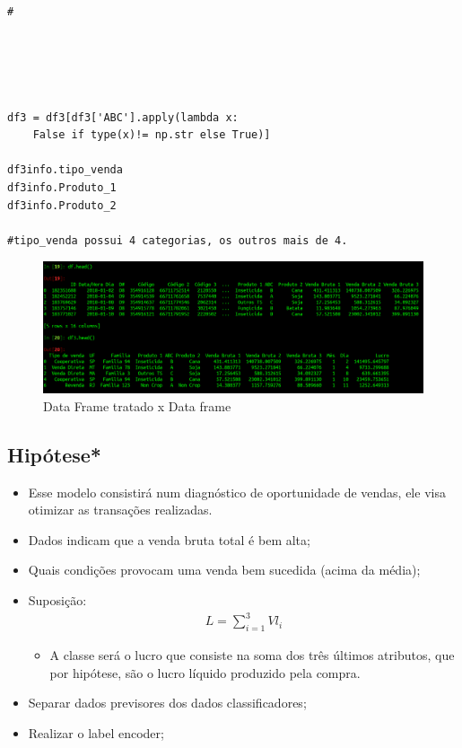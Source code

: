 \documentclass[compress]{beamer}
\begin{document}
\begin{verbatim}
#





df3 = df3[df3['ABC'].apply(lambda x:
    False if type(x)!= np.str else True)]
    
df3info.tipo_venda
df3info.Produto_1
df3info.Produto_2

#tipo_venda possui 4 categorias, os outros mais de 4.
\end{verbatim}

\begin{frame}{}
    \begin{figure}
        \centering
        \includegraphics[scale=.2]{img/dfxdf3.png}
        \caption{Data Frame tratado x Data frame }
        \label{fig:tab}
    \end{figure}
\end{frame}

\subsection{Hipótese*}
\begin{frame}{}
    \begin{itemize}
        \item Esse modelo consistirá num diagnóstico de oportunidade de vendas, ele visa otimizar as transações realizadas.
        \item Dados indicam que a venda bruta total é bem alta;
        \item Quais condições provocam uma venda bem sucedida (acima da média);
        \item Suposição:
        \begin{align*}
            L=\sum_{i=1}^{3}{Vl}_i
        \end{align*}
            \begin{itemize}
                \item A classe será o lucro que consiste na soma dos três últimos atributos, que por hipótese, são o lucro líquido produzido pela compra.
            \end{itemize}
    \item Separar dados previsores dos dados classificadores;
    \item Realizar o label encoder;
    \end{itemize}
    
\end{frame}
\end{document}
